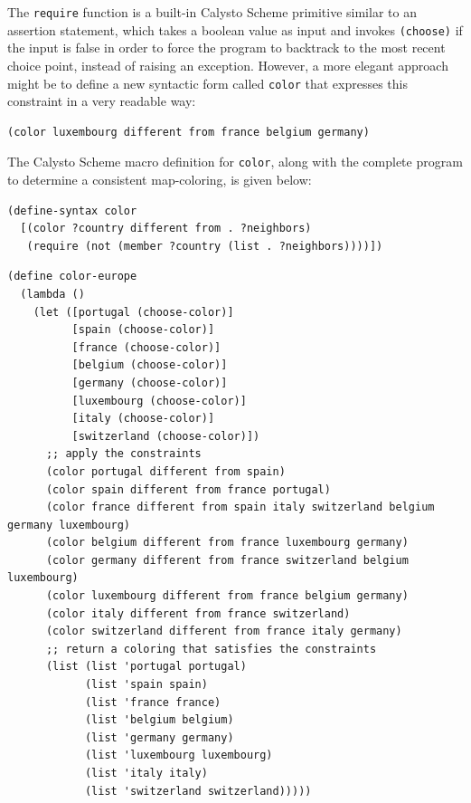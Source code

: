 \documentclass[acmsmall,screen,anonymous,review]{acmart}
\begin{document}
\noindent
The \texttt{require} function is a built-in Calysto Scheme primitive similar to
an assertion statement, which takes a boolean value as input and invokes
\texttt{(choose)} if the input is false in order to force the program to
backtrack to the most recent choice point, instead of raising an exception.
However, a more elegant approach might be to define a new syntactic form called
\texttt{color} that expresses this constraint in a very readable way:

{\small
\begin{verbatim}
(color luxembourg different from france belgium germany)
\end{verbatim}
}

\noindent
The Calysto Scheme macro definition for \texttt{color}, along with the complete
program to determine a consistent map-coloring, is given below:

{\small
\begin{verbatim}
(define-syntax color
  [(color ?country different from . ?neighbors)
   (require (not (member ?country (list . ?neighbors))))])
\end{verbatim}
}

\noindent
\begin{minipage}{\textwidth}
{\small
\begin{verbatim}
(define color-europe
  (lambda ()
    (let ([portugal (choose-color)]
          [spain (choose-color)]
          [france (choose-color)]
          [belgium (choose-color)]
          [germany (choose-color)]
          [luxembourg (choose-color)]
          [italy (choose-color)]
          [switzerland (choose-color)])
      ;; apply the constraints
      (color portugal different from spain)
      (color spain different from france portugal)
      (color france different from spain italy switzerland belgium germany luxembourg)
      (color belgium different from france luxembourg germany)
      (color germany different from france switzerland belgium luxembourg)
      (color luxembourg different from france belgium germany)
      (color italy different from france switzerland)
      (color switzerland different from france italy germany)
      ;; return a coloring that satisfies the constraints
      (list (list 'portugal portugal)
            (list 'spain spain)
            (list 'france france)
            (list 'belgium belgium)
            (list 'germany germany)
            (list 'luxembourg luxembourg)
            (list 'italy italy)
            (list 'switzerland switzerland)))))

\end{verbatim}
}
\end{minipage}
\end{document}
